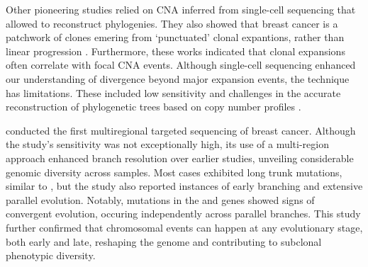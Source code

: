 Other pioneering studies relied on \ac{CNA} inferred from single-cell sequencing that allowed to reconstruct phylogenies. They also showed that breast cancer is a patchwork of clones emering from `punctuated' clonal expantions, rather than linear progression \parencite{Navin2011-qq,Wang2014-bp,Gao2016-qv}. Furthermore, these works indicated that clonal expansions often correlate with focal \ac{CNA} events. Although single-cell sequencing enhanced our understanding of divergence beyond major expansion events, the technique has limitations. These included low sensitivity and challenges in the accurate reconstruction of phylogenetic trees based on copy number profiles . 

\textcite{Yates2015-xk} conducted the first multiregional targeted sequencing of breast cancer. Although the study's sensitivity was not exceptionally high, its use of a multi-region approach enhanced branch resolution over earlier studies, unveiling considerable genomic diversity across samples. Most cases exhibited long trunk mutations, similar to \textcite{Nik-Zainal2012-zz}, but the study also reported instances of early branching and extensive parallel evolution. Notably, mutations in the  and  genes showed signs of convergent evolution, occuring independently across parallel branches. This study further confirmed that chromosomal events can happen at any evolutionary stage, both early and late, reshaping the genome and contributing to subclonal phenotypic diversity.

